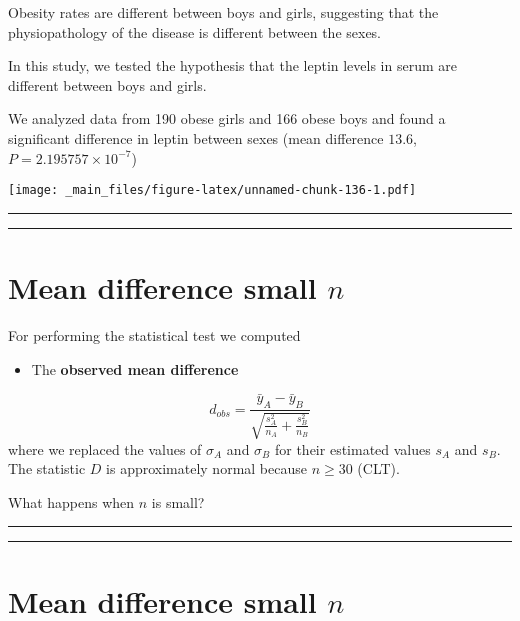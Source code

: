 \documentclass[
]{book}
\providecommand{\tightlist}{%
  \setlength{\itemsep}{0pt}\setlength{\parskip}{0pt}}
\begin{document}
Obesity rates are different between boys and girls, suggesting that the physiopathology of the disease is different between the sexes.

In this study, we tested the hypothesis that the leptin levels in serum are different between boys and girls.

We analyzed data from 190 obese girls and 166 obese boys and found a significant difference in leptin between sexes (mean difference \(13.6\), \(P=2.195757 \times 10^{-7}\))

\texttt{[image: \_main\_files/figure-latex/unnamed-chunk-136-1.pdf]}

\begin{center}\rule{0.5\linewidth}{0.5pt}\end{center}

\begin{center}\rule{0.5\linewidth}{0.5pt}\end{center}

\hypertarget{mean-difference-small-n}{%
\section{\texorpdfstring{Mean difference small \(n\)}{Mean difference small n}}\label{mean-difference-small-n}}

For performing the statistical test we computed

\begin{itemize}
\tightlist
\item
  The \textbf{observed mean difference}
\end{itemize}

\[d_{obs}=\frac{\bar{y}_A-\bar{y}_B }{\sqrt{\frac{s^2_A}{n_A}+\frac{s^2_B}{n_B}}}\]
where we replaced the values of \(\sigma_A\) and \(\sigma_B\) for their estimated values \(s_A\) and \(s_B\). The statistic \(D\) is approximately normal because \(n\ge 30\) (CLT).

What happens when \(n\) is small?

\begin{center}\rule{0.5\linewidth}{0.5pt}\end{center}

\begin{center}\rule{0.5\linewidth}{0.5pt}\end{center}

\hypertarget{mean-difference-small-n-1}{%
\section{\texorpdfstring{Mean difference small \(n\)}{Mean difference small n}}\label{mean-difference-small-n-1}}
\end{document}
